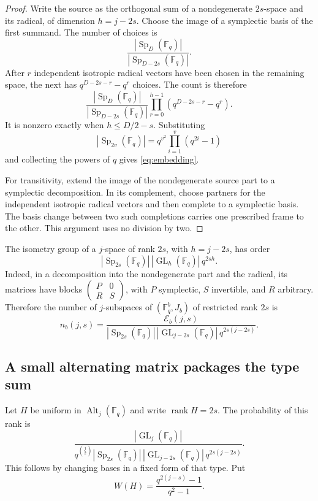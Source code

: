 \documentclass[11pt]{article}
\theoremstyle{definition}
\theoremstyle{remark}
\newcommand{\F}{\mathbb F}
\newcommand{\Alt}{\operatorname{Alt}}
\newcommand{\Sp}{\operatorname{Sp}}
\newcommand{\GL}{\operatorname{GL}}
\newcommand{\rank}{\operatorname{rank}}
\newcommand{\Emb}{\mathcal E}
\begin{document}
\begin{proof}
Write the source as the orthogonal sum of a nondegenerate $2s$-space and its radical, of dimension $h=j-2s$. Choose the image of a symplectic basis of the first summand. The number of choices is
\[
 \frac{|\Sp_D(\F_q)|}{|\Sp_{D-2s}(\F_q)|}.
\]
After $r$ independent isotropic radical vectors have been chosen in the remaining space, the next has $q^{D-2s-r}-q^r$ choices. The count is therefore
\[
 \frac{|\Sp_D(\F_q)|}{|\Sp_{D-2s}(\F_q)|}
 \prod_{r=0}^{h-1}(q^{D-2s-r}-q^r).
\]
It is nonzero exactly when $h\le D/2-s$. Substituting
\[
 |\Sp_{2v}(\F_q)|=q^{v^2}\prod_{i=1}^v(q^{2i}-1)
\]
and collecting the powers of $q$ gives \eqref{eq:embedding}.

For transitivity, extend the image of the nondegenerate source part to a symplectic decomposition. In its complement, choose partners for the independent isotropic radical vectors and then complete to a symplectic basis. The basis change between two such completions carries one prescribed frame to the other. This argument uses no division by two.
\end{proof}

The isometry group of a $j$-space of rank $2s$, with $h=j-2s$, has order
\begin{equation}\label{eq:degenerate-isometries}
 |\Sp_{2s}(\F_q)|\,|\GL_h(\F_q)|\,q^{2sh}.
\end{equation}
Indeed, in a decomposition into the nondegenerate part and the radical, its matrices have blocks $\left(\begin{smallmatrix}P&0\\R&S\end{smallmatrix}\right)$, with $P$ symplectic, $S$ invertible, and $R$ arbitrary. Therefore the number of $j$-subspaces of $(\F_q^b,J_b)$ of restricted rank $2s$ is
\begin{equation}\label{eq:subspace-type}
 n_b(j,s)=
 \frac{\Emb_b(j,s)}{|\Sp_{2s}(\F_q)|\,|\GL_{j-2s}(\F_q)|\,q^{2s(j-2s)}}.
\end{equation}

\subsection{A small alternating matrix packages the type sum}

Let $H$ be uniform in $\Alt_j(\F_q)$ and write $\rank H=2s$. The probability of this rank is
\begin{equation}\label{eq:H-type}
 \frac{|\GL_j(\F_q)|}
 {q^{\binom j2}|\Sp_{2s}(\F_q)|\,|\GL_{j-2s}(\F_q)|\,q^{2s(j-2s)}}.
\end{equation}
This follows by changing bases in a fixed form of that type. Put
\begin{equation}\label{eq:W}
 W(H)=\frac{q^{2(j-s)}-1}{q^2-1}.
\end{equation}
\end{document}
